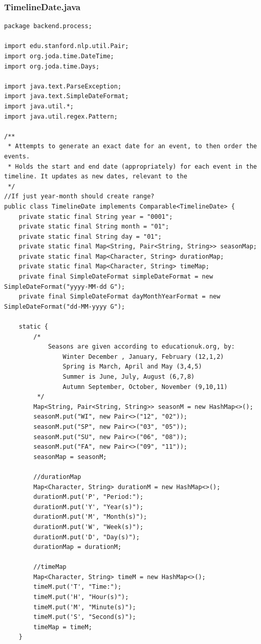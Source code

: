\subsubsection{TimelineDate.java}
\begin{lstlisting}
package backend.process;

import edu.stanford.nlp.util.Pair;
import org.joda.time.DateTime;
import org.joda.time.Days;

import java.text.ParseException;
import java.text.SimpleDateFormat;
import java.util.*;
import java.util.regex.Pattern;

/**
 * Attempts to generate an exact date for an event, to then order the events.
 * Holds the start and end date (appropriately) for each event in the timeline. It updates as new dates, relevant to the
 */
//If just year-month should create range?
public class TimelineDate implements Comparable<TimelineDate> {
    private static final String year = "0001";
    private static final String month = "01";
    private static final String day = "01";
    private static final Map<String, Pair<String, String>> seasonMap;
    private static final Map<Character, String> durationMap;
    private static final Map<Character, String> timeMap;
    private final SimpleDateFormat simpleDateFormat = new SimpleDateFormat("yyyy-MM-dd G");
    private final SimpleDateFormat dayMonthYearFormat = new SimpleDateFormat("dd-MM-yyyy G");

    static {
        /*
            Seasons are given according to educationuk.org, by:
                Winter December , January, February (12,1,2)
                Spring is March, April and May (3,4,5)
                Summer is June, July, August (6,7,8)
                Autumn September, October, November (9,10,11)
         */
        Map<String, Pair<String, String>> seasonM = new HashMap<>();
        seasonM.put("WI", new Pair<>("12", "02"));
        seasonM.put("SP", new Pair<>("03", "05"));
        seasonM.put("SU", new Pair<>("06", "08"));
        seasonM.put("FA", new Pair<>("09", "11"));
        seasonMap = seasonM;

        //durationMap
        Map<Character, String> durationM = new HashMap<>();
        durationM.put('P', "Period:");
        durationM.put('Y', "Year(s)");
        durationM.put('M', "Month(s)");
        durationM.put('W', "Week(s)");
        durationM.put('D', "Day(s)");
        durationMap = durationM;

        //timeMap
        Map<Character, String> timeM = new HashMap<>();
        timeM.put('T', "Time:");
        timeM.put('H', "Hour(s)");
        timeM.put('M', "Minute(s)");
        timeM.put('S', "Second(s)");
        timeMap = timeM;
    }


\end{lstlisting}
